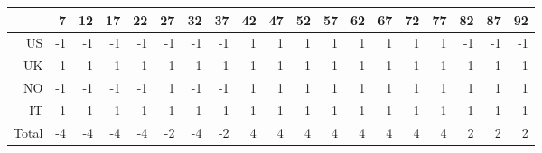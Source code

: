 \begin{tabular}{rrrrrrrrrrrrrrrrrrr}
  \hline
 & 7 & 12 & 17 & 22 & 27 & 32 & 37 & 42 & 47 & 52 & 57 & 62 & 67 & 72 & 77 & 82 & 87 & 92 \\ 
  \hline
US & -1 & -1 & -1 & -1 & -1 & -1 & -1 & 1 & 1 & 1 & 1 & 1 & 1 & 1 & 1 & -1 & -1 & -1 \\ 
  UK & -1 & -1 & -1 & -1 & -1 & -1 & -1 & 1 & 1 & 1 & 1 & 1 & 1 & 1 & 1 & 1 & 1 & 1 \\ 
  NO & -1 & -1 & -1 & -1 & 1 & -1 & -1 & 1 & 1 & 1 & 1 & 1 & 1 & 1 & 1 & 1 & 1 & 1 \\ 
  IT & -1 & -1 & -1 & -1 & -1 & -1 & 1 & 1 & 1 & 1 & 1 & 1 & 1 & 1 & 1 & 1 & 1 & 1 \\ 
  \hline
  Total & -4 & -4 & -4 & -4 & -2 & -4 & -2 & 4 & 4 & 4 & 4 & 4 & 4 & 4 & 4 & 2 & 2 & 2 \\ 
   \hline
\end{tabular}
